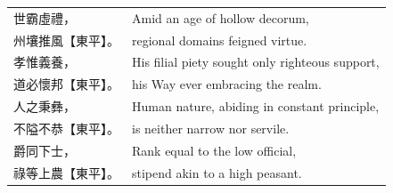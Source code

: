 \begin{longtable}{p{} p{}}







世霸虛禮， &
Amid an age of hollow decorum,\\

州壤推風【東平】。 &
regional domains feigned virtue.\\

孝惟義養， &
His filial piety sought only righteous support,\\

道必懷邦【東平】。 &
his Way ever embracing the realm.\\

人之秉彝， &
Human nature, abiding in constant principle,\\

不隘不恭【東平】。 &
is neither narrow nor servile.\\

爵同下士， &
Rank equal to the low official,\\

祿等上農【東平】。 &
stipend akin to a high peasant.\\






\end{longtable}
